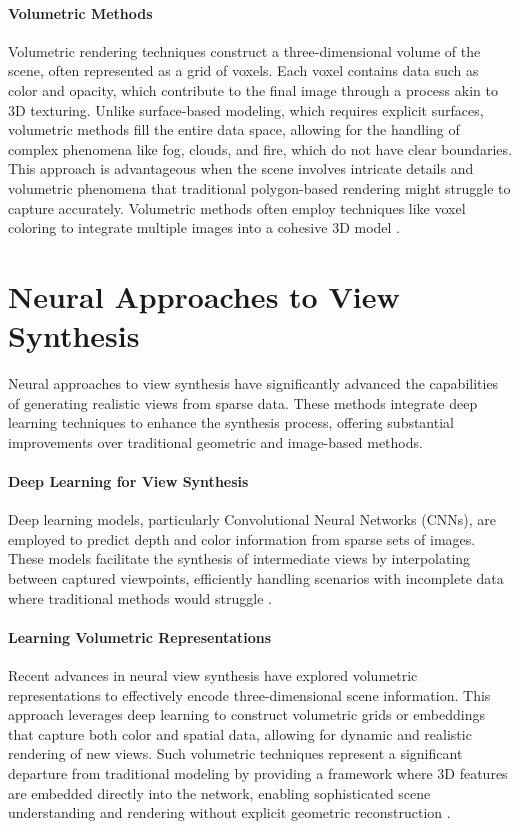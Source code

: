 \paragraph{Volumetric Methods}
Volumetric rendering techniques construct a three-dimensional volume of the scene, often represented as a grid of voxels. Each voxel contains data such as color and opacity, which contribute to the final image through a process akin to 3D texturing.
Unlike surface-based modeling, which requires explicit surfaces, volumetric methods fill the entire data space, allowing for the handling of complex phenomena like fog, clouds, and fire, which do not have clear boundaries.
This approach is advantageous when the scene involves intricate details and volumetric phenomena that traditional polygon-based rendering might struggle to capture accurately.
Volumetric methods often employ techniques like voxel coloring to integrate multiple images into a cohesive 3D model \cite{curless_volumetric_1996,seitz_photorealistic_1999}.

\section{Neural Approaches to View Synthesis}
Neural approaches to view synthesis have significantly advanced the capabilities of generating realistic views from sparse data.
These methods integrate deep learning techniques to enhance the synthesis process, offering substantial improvements over traditional geometric and image-based methods.

\paragraph{Deep Learning for View Synthesis}
Deep learning models, particularly Convolutional Neural Networks (CNNs), are employed to predict depth and color information from sparse sets of images.
These models facilitate the synthesis of intermediate views by interpolating between captured viewpoints, efficiently handling scenarios with incomplete data where traditional methods would struggle \cite{kalantari_learning-based_2016,maxim_tatarchenko_single-view_2015,peter_hedman_deep_2019}.

\paragraph{Learning Volumetric Representations}
Recent advances in neural view synthesis have explored volumetric representations to effectively encode three-dimensional scene information.
This approach leverages deep learning to construct volumetric grids or embeddings that capture both color and spatial data, allowing for dynamic and realistic rendering of new views.
Such volumetric techniques represent a significant departure from traditional modeling by providing a framework where 3D features are embedded directly into the network, enabling sophisticated scene understanding and rendering without explicit geometric reconstruction \cite{lombardi_neural_2019,sitzmann_deepvoxels_2019}.

